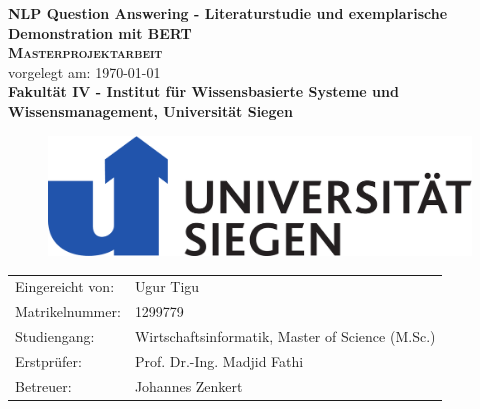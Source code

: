 \documentclass[
        ngerman,
        paper=a4,
        numbers=noendperiod,
]{scrreprt}
\begin{document}
\begin{titlepage}
    \begin{center}
    \huge \textbf{\textsf{NLP Question Answering - Literaturstudie und exemplarische Demonstration mit BERT}} \\
    \vspace{1cm}
    \LARGE\textbf{\textsc{Masterprojektarbeit}}\\
    \vspace{1cm}
    \normalsize
    vorgelegt am: \today \\
    \vspace{2.5cm}
    \large \textbf{Fakultät IV - 
Institut für Wissensbasierte
Systeme und Wissensmanagement, Universität Siegen
}
\linebreak
\linebreak
\begin{figure}[H]
    \centering\includegraphics[width=0.4\linewidth]{images/imageuni.pdf}
    \label{fig:Unilabel}
\end{figure}
    \end{center}
    \vspace{3cm}
    \begin{center}
 \normalsize{
    \begin{tabular}{ll}
    	Eingereicht von: & {Ugur Tigu} \\
    	Matrikelnummer: & {1299779} \\
    	Studiengang: & Wirtschaftsinformatik, Master of Science (M.Sc.)\\
	Erstprüfer: & Prof. Dr.-Ing. Madjid Fathi \\
	Betreuer: &   Johannes Zenkert\\
    \end{tabular}\\
    }
\end{center}
\end{titlepage}
\setcounter{page}{0}
\tableofcontents
\clearpage 
{}
\listoffigures
\clearpage 
{}
\listoftables
\clearpage 
\end{document}
